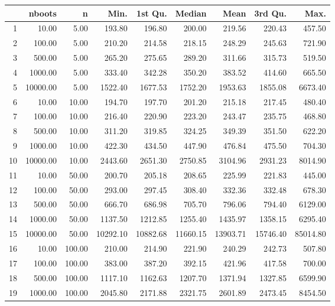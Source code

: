 \begin{table}[ht]
\centering
\begin{tabular}{rrrrrrrrr}
  \hline
 & nboots & n & Min. & 1st Qu. & Median & Mean & 3rd Qu. & Max. \\ 
  \hline
1 & 10.00 & 5.00 & 193.80 & 196.80 & 200.00 & 219.56 & 220.43 & 457.50 \\ 
  2 & 100.00 & 5.00 & 210.20 & 214.58 & 218.15 & 248.29 & 245.63 & 721.90 \\ 
  3 & 500.00 & 5.00 & 265.20 & 275.65 & 289.20 & 311.66 & 315.73 & 519.50 \\ 
  4 & 1000.00 & 5.00 & 333.40 & 342.28 & 350.20 & 383.52 & 414.60 & 665.50 \\ 
  5 & 10000.00 & 5.00 & 1522.40 & 1677.53 & 1752.20 & 1953.63 & 1855.08 & 6673.40 \\ 
  6 & 10.00 & 10.00 & 194.70 & 197.70 & 201.20 & 215.18 & 217.45 & 480.40 \\ 
  7 & 100.00 & 10.00 & 216.40 & 220.90 & 223.20 & 243.47 & 235.75 & 468.80 \\ 
  8 & 500.00 & 10.00 & 311.20 & 319.85 & 324.25 & 349.39 & 351.50 & 622.20 \\ 
  9 & 1000.00 & 10.00 & 422.30 & 434.50 & 447.90 & 476.84 & 475.50 & 704.30 \\ 
  10 & 10000.00 & 10.00 & 2443.60 & 2651.30 & 2750.85 & 3104.96 & 2931.23 & 8014.90 \\ 
  11 & 10.00 & 50.00 & 200.70 & 205.18 & 208.65 & 225.99 & 221.83 & 445.00 \\ 
  12 & 100.00 & 50.00 & 293.00 & 297.45 & 308.40 & 332.36 & 332.48 & 678.30 \\ 
  13 & 500.00 & 50.00 & 666.70 & 686.98 & 705.70 & 796.06 & 794.40 & 6129.00 \\ 
  14 & 1000.00 & 50.00 & 1137.50 & 1212.85 & 1255.40 & 1435.97 & 1358.15 & 6295.40 \\ 
  15 & 10000.00 & 50.00 & 10292.10 & 10882.68 & 11660.15 & 13903.71 & 15746.40 & 85014.80 \\ 
  16 & 10.00 & 100.00 & 210.00 & 214.90 & 221.90 & 240.29 & 242.73 & 507.80 \\ 
  17 & 100.00 & 100.00 & 383.00 & 387.20 & 392.15 & 421.96 & 417.58 & 700.00 \\ 
  18 & 500.00 & 100.00 & 1117.10 & 1162.63 & 1207.70 & 1371.94 & 1327.85 & 6599.90 \\ 
  19 & 1000.00 & 100.00 & 2045.80 & 2171.88 & 2321.75 & 2601.89 & 2473.45 & 8454.50 \\ 

\end{tabular}
\end{table}

